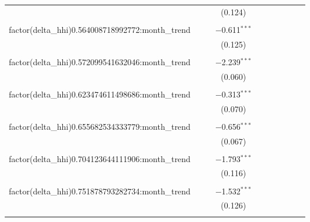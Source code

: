 \begin{table}[H]
{\begin{tabular}{@{\extracolsep{5pt}}lccccccccc}
   &  &  & (0.124) &  &  &  &  &  &  \\  

   & & & & & & & & & \\  

  factor(delta\_hhi)0.564008718992772:month\_trend &  &  & $-$0.611$^{***}$ &  &  &  &  &  &  \\  

   &  &  & (0.125) &  &  &  &  &  &  \\  

   & & & & & & & & & \\  

  factor(delta\_hhi)0.572099541632046:month\_trend &  &  & $-$2.239$^{***}$ &  &  &  &  &  &  \\  

   &  &  & (0.060) &  &  &  &  &  &  \\  

   & & & & & & & & & \\  

  factor(delta\_hhi)0.623474611498686:month\_trend &  &  & $-$0.313$^{***}$ &  &  &  &  &  &  \\  

   &  &  & (0.070) &  &  &  &  &  &  \\  

   & & & & & & & & & \\  

  factor(delta\_hhi)0.655682534333779:month\_trend &  &  & $-$0.656$^{***}$ &  &  &  &  &  &  \\  

   &  &  & (0.067) &  &  &  &  &  &  \\  

   & & & & & & & & & \\  

  factor(delta\_hhi)0.704123644111906:month\_trend &  &  & $-$1.793$^{***}$ &  &  &  &  &  &  \\  

   &  &  & (0.116) &  &  &  &  &  &  \\  

   & & & & & & & & & \\  

  factor(delta\_hhi)0.751878793282734:month\_trend &  &  & $-$1.532$^{***}$ &  &  &  &  &  &  \\  

   &  &  & (0.126) &  &  &  &  &  &  \\  

   & & & & & & & & & \\  


\end{tabular}}
\end{table}
